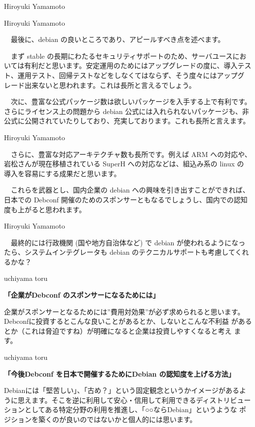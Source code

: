 \documentclass[cjk,dvipdfmx,12pt]{beamer}
\begin{document}
\begin{frame}{Hiroyuki Yamamoto}
\end{frame}\begin{frame}{Hiroyuki Yamamoto}

　最後に、debian の良いところであり、アピールすべき点を述べます。

　まず stable の長期にわたるセキュリティサポートのため、サーバユースにお
いては有利だと思います。安定運用のためにはアップグレードの度に、導入テス
ト、運用テスト、回帰テストなどをしなくてはならず、そう度々にはアップグ
レード出来ないと思われます。これは長所と言えるでしょう。

　次に、豊富な公式パッケージ数は欲しいパッケージを入手する上で有利です。
さらにライセンス上の問題から debian 公式には入れられないパッケージも、非
公式に公開されていたりしており、充実しております。これも長所と言えます。

\end{frame}\begin{frame}{Hiroyuki Yamamoto}

　さらに、豊富な対応アーキテクチャ数も長所です。例えば ARM への対応や、
岩松さんが現在移植されている SuperH への対応などは、組込み系の linux の
導入を容易にする成果だと思います。

　これらを武器とし、国内企業の debian への興味を引き出すことができれば、
日本での Debconf 開催のためのスポンサーともなるでしょうし、国内での認知
度も上がると思われます。

\end{frame}\begin{frame}{Hiroyuki Yamamoto}

　最終的には行政機関 (国や地方自治体など) で debian が使われるようになっ
たら、システムインテグレータも debian のテクニカルサポートも考慮してくれ
るかな？

\end{frame}\begin{frame}{uchiyama toru}

\textbf{「企業がDebconf のスポンサーになるためには」}

企業がスポンサーとなるためには”費用対効果”が必ず求められると思います。
Debconfに投資するとこんな良いことがあるとか、しないとこんな不利益
があるとか（これは脅迫ですね）が明確になると企業は投資しやすくなると考え
ます。

\end{frame}\begin{frame}{uchiyama toru}

\textbf{「今後Debconf を日本で開催するためにDebian の認知度を上げる方法」}

Debianには「堅苦しい」、「古め？」という固定観念というかイメージがあるよ
うに思えます。そこを逆に利用して安心・信用して利用できるディストリビュー
ションとしてある特定分野の利用を推進し、「○○ならDebian」というような
ポジションを築くのが良いのではないかと個人的には思います。


\end{frame}
\end{document}

